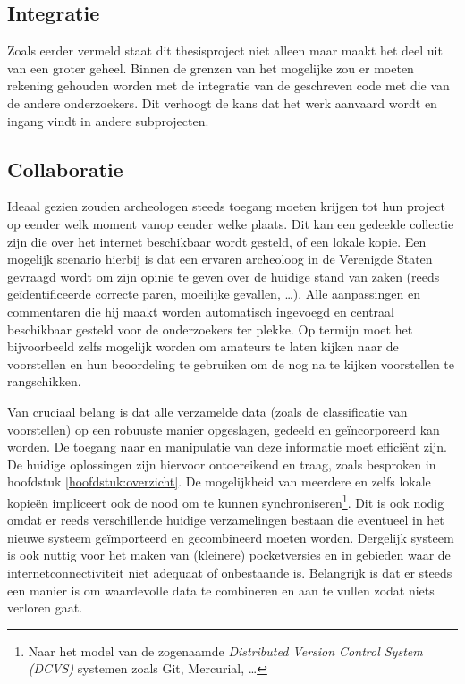 \subsection{Integratie}
Zoals eerder vermeld staat dit thesisproject niet alleen maar maakt het deel uit van een groter geheel. Binnen de grenzen van het mogelijke zou er moeten rekening gehouden worden met de integratie van de geschreven code met die van de andere onderzoekers. Dit verhoogt de kans dat het werk aanvaard wordt en ingang vindt in andere subprojecten. 

\subsection{Collaboratie}
Ideaal gezien zouden archeologen steeds toegang moeten krijgen tot hun project op eender welk moment vanop eender welke plaats. Dit kan een gedeelde collectie zijn die over het internet beschikbaar wordt gesteld, of een lokale kopie. Een mogelijk scenario hierbij is dat een ervaren archeoloog in de Verenigde Staten gevraagd wordt om zijn opinie te geven over de huidige stand van zaken (reeds ge\"identificeerde correcte paren, moeilijke gevallen, \ldots). Alle aanpassingen en commentaren die hij maakt worden automatisch ingevoegd en centraal beschikbaar gesteld voor de onderzoekers ter plekke. Op termijn moet het bijvoorbeeld zelfs mogelijk worden om amateurs te laten kijken naar de voorstellen en hun beoordeling te gebruiken om de nog na te kijken voorstellen te rangschikken.

Van cruciaal belang is dat alle verzamelde data (zoals de classificatie van voorstellen) op een robuuste manier opgeslagen, gedeeld en ge\"incorporeerd kan worden. De toegang naar en manipulatie van deze informatie moet effici\"ent zijn. De huidige oplossingen zijn hiervoor ontoereikend en traag, zoals besproken in hoofdstuk \ref{hoofdstuk:overzicht}. De mogelijkheid van meerdere en zelfs lokale kopie\"en impliceert ook de nood om te kunnen synchroniseren\footnote{Naar het model van de zogenaamde \emph{Distributed Version Control System (DCVS)} systemen zoals Git, Mercurial, \ldots}. Dit is ook nodig omdat er reeds verschillende huidige verzamelingen bestaan die eventueel in het nieuwe systeem ge\"importeerd en gecombineerd moeten worden. Dergelijk systeem is ook nuttig voor het maken van (kleinere) pocketversies en in gebieden waar de internetconnectiviteit niet adequaat of onbestaande is. Belangrijk is dat er steeds een manier is om waardevolle data te combineren en aan te vullen zodat niets verloren gaat.\\

